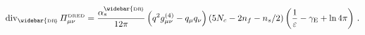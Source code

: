 \begin{equation}
{\rm div}_{{\rm \widebar{\scriptscriptstyle DR\!}}} \,
{\mit\Pi}^{\mbox{\tiny DRED}}_{\mu\nu}
=
\frac{
\alpha_s^{{\rm \widebar{\scriptscriptstyle DR\!}}}
}{ 12 \pi }
\left( q^2 g^{(4)}_{\mu\nu} - q_\mu q_\nu \right)
\left( 5 N_c - 2 n_f - n_s/2 \right)
\left( \frac{1}{\varepsilon} - \gamma_{\rm E} + \ln 4 \pi \right)
\,.
\label{ct}
\end{equation}

